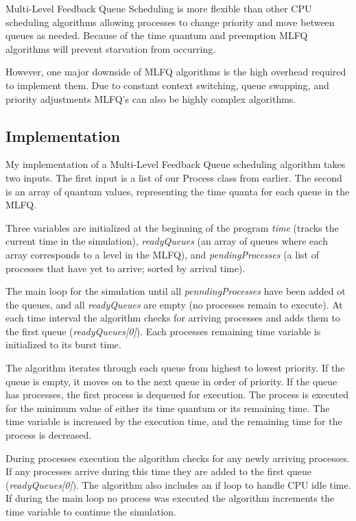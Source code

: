 \documentclass[11pt]{article}
\begin{document}
Multi-Level Feedback Queue Scheduling is more flexible than other CPU scheduling algorithms allowing processes to change priority and move between queues as needed. Because of the time quantum and preemption MLFQ algorithms will prevent starvation from occurring.

However, one major downside of MLFQ algorithms is the high overhead required to implement them. Due to constant context switching, queue swapping, and priority adjustments MLFQ's can also be highly complex algorithms.

\subsection{Implementation}


My implementation of a Multi-Level Feedback Queue scheduling algorithm takes two inputs. The first input is a list of our Process class from earlier. The second is an array of quantum values, representing the time quanta for each queue in the MLFQ.

Three variables are initialized at the beginning of the program \textit{time} (tracks the current time in the simulation), \textit{readyQueues} (an array of queues where each array corresponds to a level in the MLFQ), and \textit{pendingProcesses} (a list of processes that have yet to arrive; sorted by arrival time).

The main loop for the simulation until all \textit{penndingProcesses} have been added ot the queues, and all \textit{readyQueues} are empty (no processes remain to execute). At each time interval the algorithm checks for arriving processes and adds them to the first queue (\textit{readyQueues[0]}). Each processes remaining time variable is initialized to its burst time.

The algorithm iterates through each queue from highest to lowest priority. If the queue is empty, it moves on to the next queue in order of priority. If the queue has processes, the first process is dequeued for execution. The process is executed for the minimum value of either its time quantum or its remaining time. The time variable is increased by the execution time, and the remaining time for the process is decreased.

During processes execution the algorithm checks for any newly arriving processes. If any processes arrive during this time they are added to the first queue (\textit{readyQueues[0]}). The algorithm also includes an if loop to handle CPU idle time. If during the main loop no process was executed the algorithm increments the time variable to continue the simulation.
\end{document}
